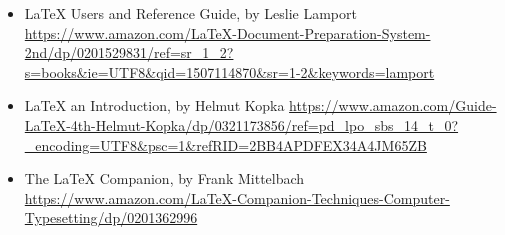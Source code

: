 \begin{itemize}

\item
  LaTeX Users and Reference Guide, by Leslie Lamport
  \url{https://www.amazon.com/LaTeX-Document-Preparation-System-2nd/dp/0201529831/ref=sr_1_2?s=books\&ie=UTF8\&qid=1507114870\&sr=1-2\&keywords=lamport}
\item
  LaTeX an Introduction, by Helmut Kopka
  \url{https://www.amazon.com/Guide-LaTeX-4th-Helmut-Kopka/dp/0321173856/ref=pd_lpo_sbs_14_t_0?_encoding=UTF8\&psc=1\&refRID=2BB4APDFEX34A4JM65ZB}
\item
  The LaTeX Companion, by Frank Mittelbach
  \url{https://www.amazon.com/LaTeX-Companion-Techniques-Computer-Typesetting/dp/0201362996}
\end{itemize}

